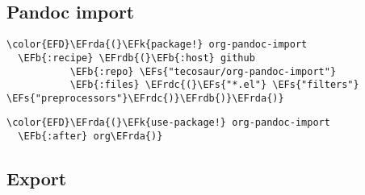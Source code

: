 \documentclass[12pt]{article}
\theoremstyle{plain}%
\theoremstyle{definition}
\theoremstyle{remark}
\newcommand{\EFs}[1]{\textcolor{EFs}{#1}} %
\newcommand{\EFk}[1]{\textcolor{EFk}{#1}} %
\newcommand{\EFb}[1]{\textcolor{EFb}{#1}} %
\newcommand{\EFrda}[1]{\textcolor{EFrda}{#1}} %
\newcommand{\EFrdb}[1]{\textcolor{EFrdb}{#1}} %
\newcommand{\EFrdc}[1]{\textcolor{EFrdc}{#1}} %
\begin{document}
\subsection{Pandoc import}
\label{sec:org6652abc}
\begin{Code}
\begin{Verbatim}
\color{EFD}\EFrda{(}\EFk{package!} org-pandoc-import
  \EFb{:recipe} \EFrdb{(}\EFb{:host} github
           \EFb{:repo} \EFs{"tecosaur/org-pandoc-import"}
           \EFb{:files} \EFrdc{(}\EFs{"*.el"} \EFs{"filters"} \EFs{"preprocessors"}\EFrdc{)}\EFrdb{)}\EFrda{)}
\end{Verbatim}
\end{Code}
\begin{Code}
\begin{Verbatim}
\color{EFD}\EFrda{(}\EFk{use-package!} org-pandoc-import
  \EFb{:after} org\EFrda{)}
\end{Verbatim}
\end{Code}
\subsection{Export}
\label{sec:orgbd91a60}
\end{document}
